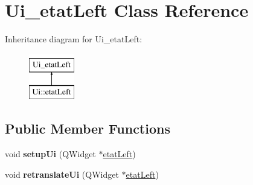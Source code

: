 \hypertarget{class_ui__etat_left}{\section{Ui\-\_\-etat\-Left Class Reference}
\label{class_ui__etat_left}
}
Inheritance diagram for Ui\-\_\-etat\-Left\-:\begin{figure}[H]
\begin{center}
\leavevmode
\includegraphics[height=2.000000cm]{class_ui__etat_left}
\end{center}
\end{figure}
\subsection*{Public Member Functions}
\begin{DoxyCompactItemize}
\item 
\hypertarget{class_ui__etat_left_a6ced76468569bc7b60f2f007c535091b}{void {\bfseries setup\-Ui} (Q\-Widget $\ast$\hyperlink{classetat_left}{etat\-Left})}\label{class_ui__etat_left_a6ced76468569bc7b60f2f007c535091b}

\item 
\hypertarget{class_ui__etat_left_a8a2d38afa659c1af5db423e286b41eda}{void {\bfseries retranslate\-Ui} (Q\-Widget $\ast$\hyperlink{classetat_left}{etat\-Left})}\label{class_ui__etat_left_a8a2d38afa659c1af5db423e286b41eda}

\end{DoxyCompactItemize}
